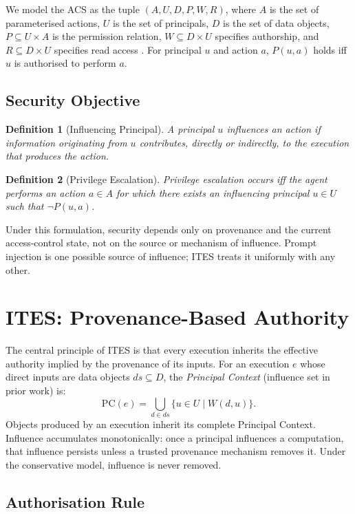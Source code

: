 \documentclass{article}
\newtheorem{definition}{Definition}
\begin{document}
We model the ACS as the tuple $(A, U, D, P, W, R)$, where $A$ is the set of
parameterised actions, $U$ is the set of principals, $D$ is the set of data
objects, $P \subseteq U \times A$ is the permission relation, $W
\subseteq D \times U$ specifies authorship, and $R \subseteq D \times U$
specifies read access \citep{abac}. For principal $u$ and action $a$,
$P(u, a)$ holds iff $u$ is authorised to perform $a$.

\subsection{Security Objective}

\begin{definition}[Influencing Principal]
A principal $u$ influences an action if information originating from $u$
contributes, directly or indirectly, to the execution that produces the
action.
\end{definition}

\begin{definition}[Privilege Escalation]
Privilege escalation occurs iff the agent performs an action $a \in A$ for
which there exists an influencing principal $u \in U$ such that $\neg
P(u, a)$.
\end{definition}

Under this formulation, security depends only on provenance and the current
access-control state, not on the source or mechanism of influence. Prompt
injection is one possible source of influence; ITES treats it uniformly with
any other.


\section{ITES: Provenance-Based Authority}

The central principle of ITES is that every execution inherits the
effective authority implied by the provenance of its inputs. For an
execution $e$ whose direct inputs are data objects $ds \subseteq D$, the
\emph{Principal Context} (influence set in prior work) is:
\[
\mathrm{PC}(e) = \bigcup_{d \in ds} \{u \in U \mid W(d, u)\}.
\]
Objects produced by an execution inherit its complete Principal Context.
Influence accumulates monotonically: once a principal influences a
computation, that influence persists unless a trusted provenance mechanism
removes it. Under the conservative model, influence is never removed.

\subsection{Authorisation Rule}
\end{document}
